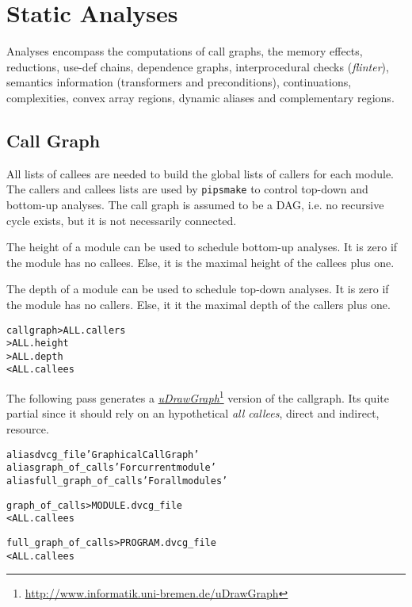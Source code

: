\documentclass[a4paper]{report}
\newenvironment{PipsMake}{\begin{alltt}}{\end{alltt}}
\newcommand{\LINK}[2]{\href{#2}{#1}\footnote{\url{#2}}\xspace}
\newcommand{\Pipsmake}{\texttt{pipsmake}}
\newcommand{\PuDrawGraph}{\LINK{\emph{uDrawGraph}}{http://www.informatik.uni-bremen.de/uDrawGraph}\xspace}
\begin{document}

\chapter{Static Analyses}
\label{section-analyses}

Analyses encompass the computations of call graphs, the memory effects,
reductions, use-def chains, dependence graphs, interprocedural checks
({\em flinter}), semantics information (transformers and preconditions),
continuations, complexities, convex array regions, dynamic aliases and
complementary regions.

\section{Call Graph}
\label{subsection-call-graph}

All lists of callees are needed to build the global lists of callers
for each module. The callers and callees lists are used by \Pipsmake{}
to control top-down and bottom-up analyses. The call graph is
assumed to be a DAG, i.e. no recursive cycle exists, but it is not
necessarily connected.

The height of a module can be used to schedule bottom-up analyses. It is
zero if the module has no callees. Else, it is the maximal height of the
callees plus one.

The depth of a module can be used to schedule top-down analyses. It is
zero if the module has no callers. Else, it it the maximal depth of the
callers plus one.

\begin{PipsMake}
callgraph                       > ALL.callers
                                > ALL.height
                                > ALL.depth
        < ALL.callees
\end{PipsMake}

The following pass generates a \PuDrawGraph version of the callgraph.  Its
quite partial since it should rely on an hypothetical \emph{all callees},
direct and indirect, resource.

\begin{PipsMake}
alias dvcg_file 'Graphical Call Graph'
alias graph_of_calls 'For current module'
alias full_graph_of_calls 'For all modules'

graph_of_calls               > MODULE.dvcg_file
        < ALL.callees

full_graph_of_calls          > PROGRAM.dvcg_file
        < ALL.callees
\end{PipsMake}
\end{document}

